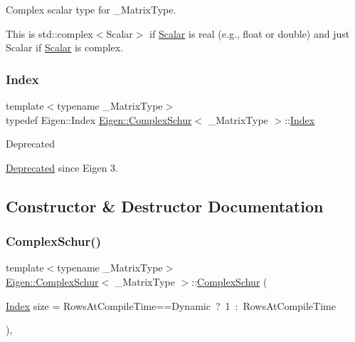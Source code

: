Complex scalar type for {\ttfamily \+\_\+\+Matrix\+Type}. 

This is {\ttfamily std\+::complex$<$\+Scalar$>$} if \mbox{\hyperlink{class_eigen_1_1_complex_schur_a9a8ee9df37ee1f90d0e53103c58683c0}{Scalar}} is real (e.\+g., {\ttfamily float} or {\ttfamily double}) and just {\ttfamily Scalar} if \mbox{\hyperlink{class_eigen_1_1_complex_schur_a9a8ee9df37ee1f90d0e53103c58683c0}{Scalar}} is complex. \mbox{\label{class_eigen_1_1_complex_schur_a652104d13723a5b1db2937866a034557}} 
\subsubsection{\texorpdfstring{Index}{Index}}
{\footnotesize\ttfamily template$<$typename \+\_\+\+Matrix\+Type$>$ \\
typedef Eigen\+::\+Index \mbox{\hyperlink{class_eigen_1_1_complex_schur}{Eigen\+::\+Complex\+Schur}}$<$ \+\_\+\+Matrix\+Type $>$\+::\mbox{\hyperlink{class_eigen_1_1_complex_schur_a652104d13723a5b1db2937866a034557}{Index}}}

\begin{DoxyRefDesc}{Deprecated}
\item[\mbox{\hyperlink{deprecated__deprecated000017}{Deprecated}}]since Eigen 3. \end{DoxyRefDesc}


\subsection{Constructor \& Destructor Documentation}
\mbox{\label{class_eigen_1_1_complex_schur_ad707d9978dc36b3b15e460c2a83f4093}} 
\subsubsection{\texorpdfstring{ComplexSchur()}{ComplexSchur()}\hspace{0.1cm}{\footnotesize\ttfamily [1/2]}}
{\footnotesize\ttfamily template$<$typename \+\_\+\+Matrix\+Type$>$ \\
\mbox{\hyperlink{class_eigen_1_1_complex_schur}{Eigen\+::\+Complex\+Schur}}$<$ \+\_\+\+Matrix\+Type $>$\+::\mbox{\hyperlink{class_eigen_1_1_complex_schur}{Complex\+Schur}} (\begin{DoxyParamCaption}\item[{\mbox{\hyperlink{class_eigen_1_1_complex_schur_a652104d13723a5b1db2937866a034557}{Index}}}]{size = {\ttfamily RowsAtCompileTime==Dynamic~?~1~\+:~RowsAtCompileTime} }\end{DoxyParamCaption})\hspace{0.3cm}{\ttfamily [inline]}, {\ttfamily [explicit]}}



